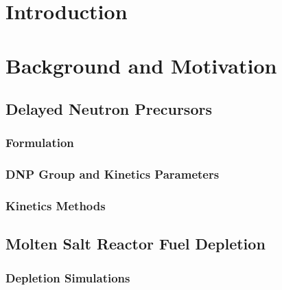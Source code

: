 \chapter{Introduction}



\chapter{Background and Motivation}



\section{Delayed Neutron Precursors}



\subsection{Formulation}
\label{sec:measurementofdnps}


\subsection{DNP Group and Kinetics Parameters}
\label{sec:gandkparams}


\subsection{Kinetics Methods}
\label{sec:bg-trans-analysis-methods}




\section{Molten Salt Reactor Fuel Depletion}


\subsection{Depletion Simulations}
\label{sec:dep-sim}


